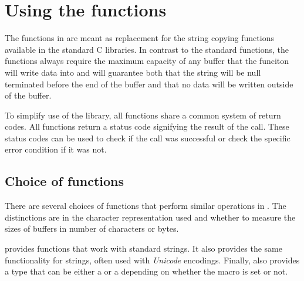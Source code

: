 \section{Using the \strsafe{} functions}
The functions in \strsafe{} are meant as replacement for
the string copying functions available in the standard C libraries.
In contrast to the standard functions,
the functions always require the maximum capacity of any buffer
that the funciton will write data into
and will guarantee both
that the string will be null terminated before the end of the buffer
and that no data will be written outside of the buffer.

To simplify use of the library,
all functions share a common system of return codes.
All functions return a status code signifying the result of the call.
These status codes can be used to check if the call was successful
or check the specific error condition if it was not.

\subsection{Choice of functions}
There are several choices of functions
that perform similar operations in \strsafe{}.
The distinctions are in the character representation used
and whether to measure the sizes of buffers
in number of characters or bytes.

\strsafe{} provides functions that work with standard  strings.
It also provides the same functionality for  strings,
often used with \emph{Unicode} encodings.
Finally, \strsafe{} also provides a  type that can be either a
 or a  depending on
whether the macro  is set or not.
